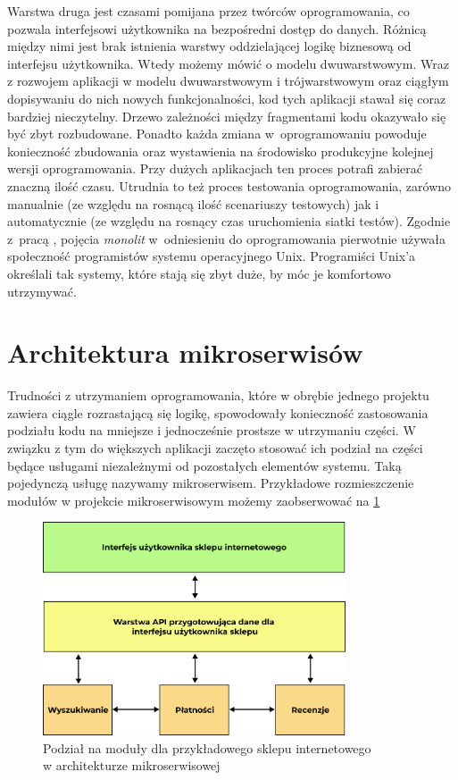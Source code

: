 \documentclass{SGGW-thesis}
\begin{document}
Warstwa druga jest czasami pomijana przez twórców oprogramowania, co pozwala interfejsowi użytkownika na bezpośredni dostęp do danych. Różnicą między nimi jest brak istnienia warstwy oddzielającej logikę biznesową od interfejsu użytkownika. Wtedy możemy mówić o modelu dwuwarstwowym.
Wraz z rozwojem aplikacji w modelu dwuwarstwowym i trójwarstwowym oraz ciągłym dopisywaniu do nich nowych funkcjonalności, kod tych aplikacji stawał się coraz bardziej nieczytelny. Drzewo zależności między fragmentami kodu okazywało się być zbyt rozbudowane.
Ponadto każda zmiana w~oprogramowaniu powoduje konieczność zbudowania oraz wystawienia na środowisko produkcyjne kolejnej wersji oprogramowania. Przy dużych aplikacjach ten proces potrafi zabierać znaczną ilość czasu. Utrudnia to też proces testowania oprogramowania, zarówno manualnie (ze względu na rosnącą ilość scenariuszy testowych) jak i automatycznie (ze względu na rosnący czas uruchomienia siatki testów).
Zgodnie z~pracą \cite{fowler}, pojęcia \textit{monolit} w~odniesieniu do oprogramowania pierwotnie używała społeczność programistów systemu operacyjnego Unix. Programiści Unix'a określali tak systemy, które stają się zbyt duże, by móc je komfortowo utrzymywać.

\section{Architektura mikroserwisów}

Trudności z utrzymaniem oprogramowania, które w obrębie jednego projektu zawiera ciągle rozrastającą się logikę, spowodowały konieczność zastosowania podziału kodu na mniejsze i jednocześnie prostsze w utrzymaniu części.
W związku z tym do większych aplikacji zaczęto stosować ich podział na części będące usługami niezależnymi od pozostałych elementów systemu. Taką pojedynczą usługę nazywamy mikroserwisem. Przykładowe rozmieszczenie modułów w projekcie mikroserwisowym możemy zaobserwować na \cref{fig:microservices_diagram}

\vfill
\clearpage

\begin{figure}[h]
	\centering
	\captionsetup{justification=centering}
	\includegraphics[width=0.8\textwidth]{microservices_diagram.png}
	\caption{Podział na moduły dla przykładowego sklepu internetowego \\ w architekturze mikroserwisowej}
	\label{fig:microservices_diagram}
\end{figure}
\end{document}

